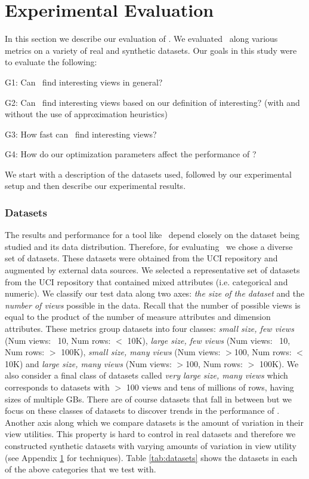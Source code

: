 
\section{Experimental Evaluation}

In this section we describe our evaluation of \VizRecDB.
We evaluated \VizRecDB\ along various metrics on a variety of real and synthetic
datasets.
Our goals in this study were to evaluate the following: 
\squishlist
\item G1: Can \VizRecDB\ find interesting views in general?
\item G2: Can \VizRecDB\ find interesting views based on our definition of
interesting? (with and without the use of approximation heuristics)
\item G3: How fast can \VizRecDB\ find interesting views?
\item G4: How do our optimization parameters affect the performance of
\VizRecDB?
\squishend

We start with a description of the datasets used, followed by our experimental
setup and then describe our experimental results.

\subsubsection*{Datasets}
The results and performance
for a tool like \VizRecDB\ depend closely on the dataset being studied and its
data distribution.
Therefore, for evaluating \VizRecDB\ we chose a diverse set of datasets.
These datasets were obtained from the UCI repository and augmented by
external data sources. 
We selected a representative set of datasets from the UCI repository that
contained mixed attributes (i.e. categorical and numeric).
We classify our test data along two axes: {\it the size of the dataset} and the
{\it number of views} possible in the data. 
Recall that the number of possible views is equal to the product of the number
of measure attributes and dimension attributes.
These metrics group datasets into four classes: {\it small size, few views}
(Num views: ~10, Num rows: $<$ 10K), {\it large size, few
views} (Num views: ~10, Num rows: $>$ 100K), {\it small size, many views}
(Num views: $>$100, Num rows: $<$ 10K) and {\it large size, many views} (Num
views: $>$100, Num rows: $>$ 100K).
We also consider a final class of datasets called {\it very large size, many
views} which corresponds to datasets with $>$ 100 views and tens of millions of
rows, having sizes of multiple GBs.
There are of course datasets that fall in between but we focus on
these classes of datasets to discover trends in the performance of \VizRecDB.
Another axis along which we compare datasets is the amount of variation in
their view utilities.
This property is hard to control in real datasets and therefore we constructed
synthetic datasets with varying amounts of variation in view utility (see
Appendix \ref{} for techniques).
Table \ref{tab:datasets} shows the datasets in each of the
above categories that we test with.

